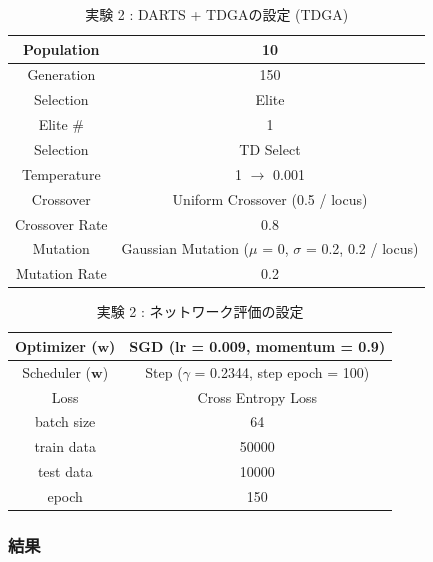 \begin{table}[t]
  \begin{center}
    \caption{実験 2 : DARTS + TDGAの設定 (TDGA)}
  	\vspace{3mm}
    \begin{tabular}{|c|c|} \hline
      Population & 10 \\ \hline
      Generation & 150 \\ \hline \hline
      Selection & Elite \\ \hline
      Elite \# & 1 \\ \hline
      Selection & TD Select \\ \hline
      Temperature & 1 $\rightarrow$ 0.001 \\ \hline \hline
      Crossover & Uniform Crossover (0.5 / locus) \\ \hline
      Crossover Rate & 0.8 \\ \hline \hline
      Mutation & Gaussian Mutation ($\mu$ = 0, $\sigma$ = 0.2, 0.2 / locus)\\ \hline
      Mutation Rate & 0.2 \\ \hline
    \end{tabular}
    \label{tab:setting_ga}
  \end{center}
\end{table}

\begin{table}[t]
  \begin{center}
    \caption{実験 2 : ネットワーク評価の設定}
  	\vspace{3mm}
    \begin{tabular}{|c|c|} \hline
      Optimizer ($\bm{w}$) & SGD (lr = 0.009, momentum = 0.9) \\ \hline
      Scheduler ($\bm{w}$) & Step ($\gamma$ = 0.2344, step epoch = 100) \\ \hline
      Loss & Cross Entropy Loss \\ \hline
      batch size & 64 \\ \hline
      train data & 50000\\ \hline
      test data &  10000\\ \hline
      epoch & 150\\ \hline
    \end{tabular}
    \label{tab:setting_eval}
  \end{center}
\end{table}


\clearpage
\changeindent{0cm}
\subsubsection{結果}
\label{sec:exp.02_02}
\changeindent{2cm}



